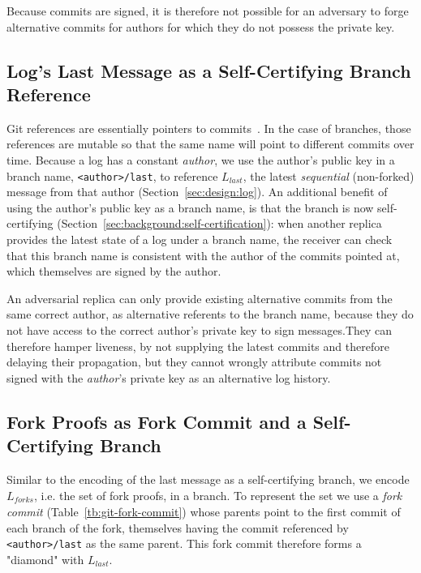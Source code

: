 \documentclass[9pt, oneside]{article}   	%
\begin{document}
Because commits are signed, it is therefore not possible for an adversary to forge alternative commits for authors for which they do not possess the private key.


\subsection{Log's Last Message as a Self-Certifying Branch Reference}

Git references are essentially pointers to commits~\cite{git-reference}. In the case of branches, those references are mutable so that the same name will point to different commits over time. Because a log has a constant \textit{author}, we use the author's public key in a branch name,  \texttt{<author>/last}, to reference $L_\textit{last}$, the latest \textit{sequential} (non-forked) message  from that author (Section~\ref{sec:design:log}). An additional benefit of using the author's public key as a branch name, is that the branch is now self-certifying (Section~\ref{sec:background:self-certification}): when another replica provides the latest state of a log under a branch name, the receiver can check that this branch name is consistent with the author of the commits pointed at, which themselves are signed by the author. 

An adversarial replica can only provide existing alternative commits from the same correct author, as alternative referents to the branch name, because they do not have access to the correct author's private key to sign messages.They can therefore hamper liveness, by not supplying the latest commits and therefore delaying their propagation, but they cannot wrongly attribute commits not signed with the \textit{author}'s private key as an alternative log history.

\subsection{Fork Proofs as Fork Commit and a Self-Certifying Branch}

Similar to the encoding of the last message as a self-certifying branch, we encode $L_\textit{forks}$, i.e. the set of fork proofs, in a branch. To represent the set we use a \textit{fork commit} (Table~\ref{tb:git-fork-commit}) whose parents point to the first commit of each branch of the fork, themselves having the commit referenced by  \texttt{<author>/last} as the same parent. This fork commit therefore forms a "diamond" with $L_\textit{last}$.
\end{document}
